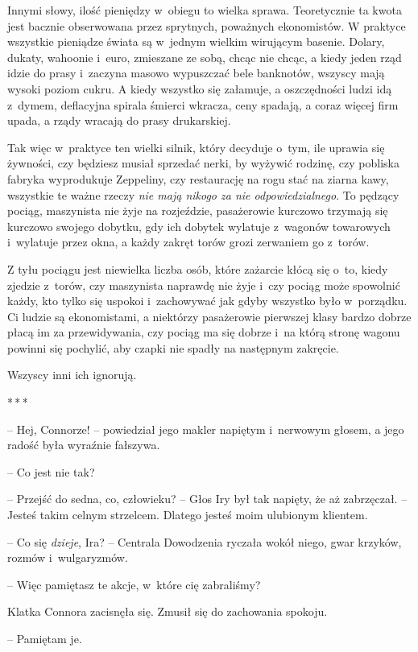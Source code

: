 \documentclass[oneside,polish,11pt,rmheadings]{mwbk}
\newcommand{\threeast}{\par\centerline{*\,*\,*}\medskip\par}
\begin{document}
Innymi słowy, ilość pieniędzy w~obiegu to wielka sprawa. Teoretycznie ta kwota jest bacznie obserwowana przez sprytnych, poważnych ekonomistów. W praktyce wszystkie pieniądze świata są w~jednym wielkim wirującym basenie. Dolary, dukaty, wahoonie i~euro, zmieszane ze sobą, chcąc nie chcąc, a kiedy jeden rząd idzie do prasy i~zaczyna masowo wypuszczać bele banknotów, wszyscy mają wysoki poziom cukru. A kiedy wszystko się załamuje, a oszczędności ludzi idą z~dymem, deflacyjna spirala śmierci wkracza, ceny spadają, a coraz więcej firm upada, a rządy wracają do prasy drukarskiej.

Tak więc w~praktyce ten wielki silnik, który decyduje o~tym, ile uprawia się żywności, czy będziesz musiał sprzedać nerki, by wyżywić rodzinę, czy pobliska fabryka wyprodukuje Zeppeliny, czy restaurację na rogu stać na ziarna kawy, wszystkie te ważne rzeczy \textit{nie mają nikogo za nie odpowiedzialnego}. To pędzący pociąg, maszynista nie żyje na rozjeździe, pasażerowie kurczowo trzymają się kurczowo swojego dobytku, gdy ich dobytek wylatuje z~wagonów towarowych i~wylatuje przez okna, a każdy zakręt torów grozi zerwaniem go z~torów.

Z tyłu pociągu jest niewielka liczba osób, które zażarcie kłócą się o~to, kiedy zjedzie z~torów, czy maszynista naprawdę nie żyje i~czy pociąg może spowolnić każdy, kto tylko się uspokoi i~zachowywać jak gdyby wszystko było w~porządku. Ci ludzie są ekonomistami, a niektórzy pasażerowie pierwszej klasy bardzo dobrze płacą im za przewidywania, czy pociąg ma się dobrze i~na którą stronę wagonu powinni się pochylić, aby czapki nie spadły na następnym zakręcie.

Wszyscy inni ich ignorują.

\bigskip
\threeast

-- Hej, Connorze! -- powiedział jego makler napiętym i~nerwowym głosem, a jego radość była wyraźnie fałszywa.

-- Co jest nie tak? 

-- Przejść do sedna, co, człowieku? -- Głos Iry był tak napięty, że aż zabrzęczał. -- Jesteś takim celnym strzelcem. Dlatego jesteś moim ulubionym klientem. 

-- Co się \textit{dzieje}, Ira? -- Centrala Dowodzenia ryczała wokół niego, gwar krzyków, rozmów i~wulgaryzmów.

-- Więc pamiętasz te akcje, w~które cię zabraliśmy?

Klatka Connora zacisnęła się. Zmusił się do zachowania spokoju. 

-- Pamiętam je.
\end{document}

